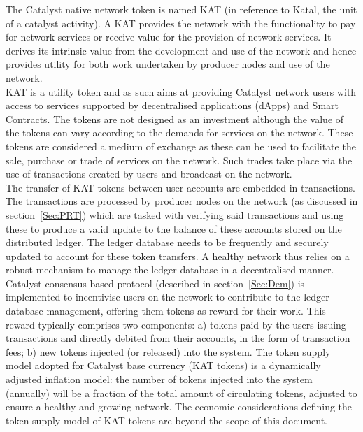 The Catalyst native network token is named KAT (in reference to Katal, the unit of a catalyst activity). A KAT provides the network with the functionality to pay for network services or receive value for the provision of network services. It derives its intrinsic value from the development and use of the network and hence provides utility for both work undertaken by producer nodes and use of the network. \\


KAT is a utility token and as such aims at providing Catalyst network users with access to services supported by decentralised applications (dApps) and Smart Contracts. The tokens are not designed as an investment although the value of the tokens can vary according to the demands for services on the network. These tokens are considered a medium of exchange as these can be used to facilitate the sale, purchase or trade of services on the network. Such trades take place via the use of transactions created by users and broadcast on the network. \\

The transfer of KAT tokens between user accounts are embedded in transactions. The transactions are processed by producer nodes on the network (as discussed in section~\ref{Sec:PRT}) which are tasked with verifying said transactions and using these to produce a valid update to the balance of these accounts stored on the distributed ledger. The ledger database needs to be frequently and securely updated to account for these token transfers. A healthy network thus relies on a robust mechanism to manage the ledger database in a decentralised manner. Catalyst consensus-based protocol (described in section~\ref{Sec:Dem}) is implemented to incentivise users on the network to contribute to the ledger database management, offering them tokens as reward for their work. This reward typically comprises two components: a) tokens paid by the users issuing transactions and directly debited from their accounts, in the form of transaction fees; b) new tokens injected (or released) into the system. The token supply model adopted for Catalyst base currency (KAT tokens) is a dynamically adjusted inflation model: the number of tokens injected into the system (annually) will be a fraction of the total amount of circulating tokens, adjusted to ensure a healthy and growing network. The economic considerations defining the token supply model of KAT tokens are beyond the scope of this document. 
